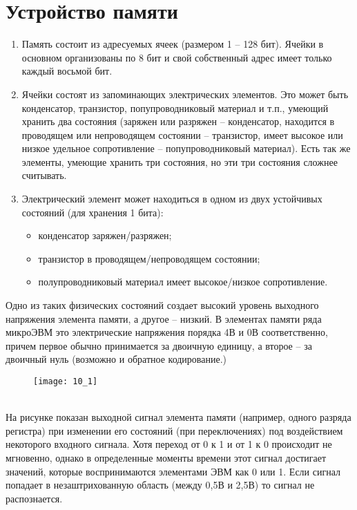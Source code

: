 \section{Устройство памяти}
\begin{enumerate}
 \item Память состоит из адресуемых ячеек (размером 1 -- 128 бит). Ячейки в основном организованы по 8 бит и свой собственный адрес имеет только каждый восьмой бит.
 \item Ячейки состоят из запоминающих электрических элементов. Это может быть конденсатор, транзистор, попупроводниковый материал и т.п., умеющий хранить два состояния (заряжен или разряжен -- конденсатор, находится в проводящем или непроводящем состоянии -- транзистор, имеет высокое или низкое удельное сопротивление -- попупроводниковый материал). Есть так же элементы, умеющие хранить три состояния, но эти три состояния сложнее считывать.
 \item Электрический элемент может находиться в одном из двух устойчивых состояний (для хранения 1 бита):
 \begin{itemize}
   \item конденсатор заряжен/разряжен;
   \item транзистор в проводящем/непроводящем состоянии;
   \item полупроводниковый материал имеет высокое/низкое сопротивление.
 \end{itemize}
\end{enumerate}
Одно из таких физических состояний создает высокий уровень выходного напряжения элемента памяти, а другое -- низкий. В элементах памяти ряда микроЭВМ это электрические напряжения порядка 4В и 0В соответственно, причем первое обычно принимается за двоичную единицу, а второе -- за двоичный нуль (возможно и обратное кодирование.)
\begin{figure}[h]
\texttt{[image: 10\_1]}
\end{figure}
\\На рисунке показан выходной сигнал элемента памяти (например, одного разряда регистра) при изменении его состояний (при переключениях) под воздействием некоторого входного сигнала. Хотя переход от 0 к 1 и от 1 к 0 происходит не мгновенно, однако в определенные моменты времени этот сигнал достигает значений, которые воспринимаются элементами ЭВМ как 0 или 1. Если сигнал попадает в незаштрихованную область (между 0,5В и 2,5В) то сигнал не распознается.
\\

